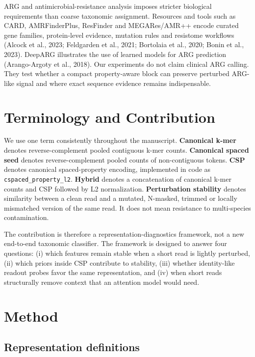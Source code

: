 \documentclass[10.5pt]{article}
\begin{document}
ARG and antimicrobial-resistance analysis imposes stricter biological requirements than coarse taxonomic assignment. Resources and tools such as CARD, AMRFinderPlus, ResFinder and MEGARes/AMR++ encode curated gene families, protein-level evidence, mutation rules and resistome workflows (Alcock et al., 2023; Feldgarden et al., 2021; Bortolaia et al., 2020; Bonin et al., 2023). DeepARG illustrates the use of learned models for ARG prediction (Arango-Argoty et al., 2018). Our experiments do not claim clinical ARG calling. They test whether a compact property-aware block can preserve perturbed ARG-like signal and where exact sequence evidence remains indispensable.


\section*{Terminology and Contribution}

We use one term consistently throughout the manuscript. \textbf{Canonical k-mer} denotes reverse-complement pooled contiguous k-mer counts. \textbf{Canonical spaced seed} denotes reverse-complement pooled counts of non-contiguous tokens. \textbf{CSP} denotes canonical spaced-property encoding, implemented in code as \texttt{cspaced\_property\_l2}. \textbf{Hybrid} denotes a concatenation of canonical k-mer counts and CSP followed by L2 normalization. \textbf{Perturbation stability} denotes similarity between a clean read and a mutated, N-masked, trimmed or locally mismatched version of the same read. It does not mean resistance to multi-species contamination.


The contribution is therefore a representation-diagnostics framework, not a new end-to-end taxonomic classifier. The framework is designed to answer four questions: (i) which features remain stable when a short read is lightly perturbed, (ii) which priors inside CSP contribute to stability, (iii) whether identity-like readout probes favor the same representation, and (iv) when short reads structurally remove context that an attention model would need.


\section*{Method}

\subsection*{Representation definitions}
\end{document}
